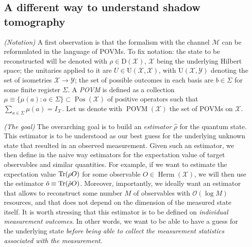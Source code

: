 \documentclass[12pt]{report}
\newcommand{\on}[1]{\operatorname{#1}}
\newcommand{\calY}{{\mathcal{Y}}}
\newcommand{\calM}{{\mathcal{M}}}
\newcommand{\calO}{{\mathcal{O}}}
\newcommand{\calX}{{\mathcal{X}}}
\newcommand{\rmD}{{\mathrm{D}}}
\newcommand{\rmU}{{\mathrm{U}}}
\newcommand{\heading}[1]{{\color{Mahogany}\emph{(#1)}}}
\DeclareMathOperator{\Pos}{Pos}
\DeclareMathOperator{\Herm}{Herm}
\begin{document}
\subsection{A different way to understand shadow tomography}

\heading{Notation}
A first observation is that the formalism with the channel $\calM$ can be reformulated in the language of POVMs.
To fix notation: the state to be reconstructed will be denoted with $\rho\in\rmD(\calX)$, $\calX$ being the underlying Hilbert space; the unitaries applied to it are $U\in\rmU(\calX,\calX)$, with $\rmU(\calX,\calY)$ denoting the set of isometries $\calX\to\calY$; the set of possible outcomes in each basis are $b\in\Sigma$ for some finite register $\Sigma$.
A \emph{POVM} is defined as a collection $\mu\equiv\{\mu(a): a\in\Sigma\}\subset\Pos(\calX)$ of positive operators such that $\sum_{a\in\Sigma}\mu(a)=I_{\calX}$.
Let us denote with $\on{POVM}(\calX)$ the set of POVMs on $\calX$.

\heading{The goal}
The overarching goal is to build an \emph{estimator} $\hat\rho$ for the quantum state. This estimator is to be understood as our best guess for the underlying unknown state that resulted in an observed measurement.
Given such an estimator, we then define in the naive way estimators for the expectation value of target observables and similar quantities.
For example, if we want to estimate the expectation value $\Tr(\rho O)$ for some observable $O\in\Herm(\calX)$, we will then use the estimator $\hat o\equiv\Tr(\hat\rho O)$.
Moreover, importantly, we ideally want an estimator that allows to reconstruct some number $M$ of observables with $\calO(\log M)$ resources, and that does not depend on the dimension of the measured state itself.
It is worth stressing that this estimator is to be defined on \emph{individual measurement outcomes}. In other words, we want to be able to have a guess for the underlying state \emph{before being able to collect the measurement statistics associated with the measurement}.
\end{document}

